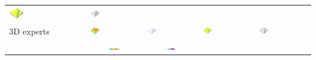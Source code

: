 \documentclass[Afour,sageh,times]{sagej}
\begin{document}
\begin{table}
\begin{tabular}{m{} m{} m{} m{} m{}}
\includegraphics[width=0.2\textwidth]{images/render_3d/3d_novices/mean_depth_5.png} &
\includegraphics[width=0.2\textwidth]{images/render_3d/3d_novices/mean_depth_difference_5.png}\\
%
3D experts & 
\includegraphics[width=0.2\textwidth]{images/render_3d/3d_experts/mean_dem_5.png} &
\includegraphics[width=0.2\textwidth]{images/render_3d/3d_experts/stdev_regression_difference_series_5.png} &
\includegraphics[width=0.2\textwidth]{images/render_3d/3d_experts/mean_depth_5.png} &
\includegraphics[width=0.2\textwidth]{images/render_3d/3d_experts/mean_depth_difference_5.png}\\
%
& 
\multicolumn{1}{c}{\includegraphics[width=0.22\textwidth]{images/legends/elevation_legend_5.pdf}} &
\multicolumn{1}{c}{\includegraphics[width=0.22\textwidth]{images/legends/stdev_diff_legend.pdf}} &

\end{tabular}
\end{table}
\end{document}
